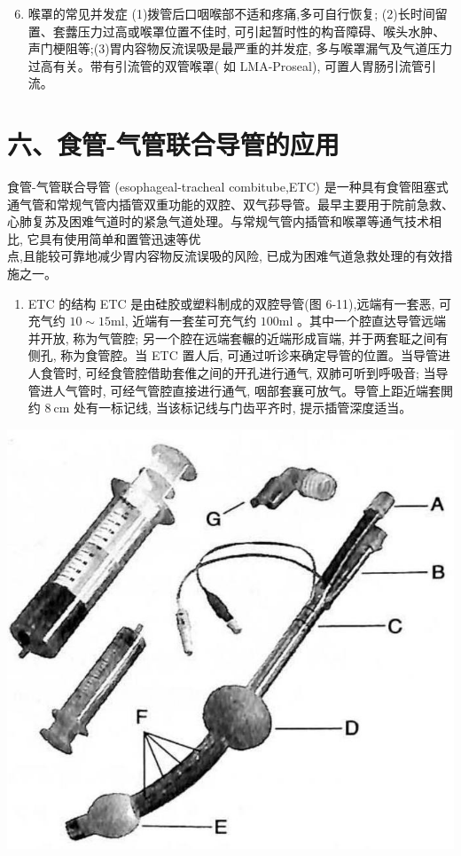 \documentclass[10pt]{article}
\begin{document}
\begin{enumerate}
  \setcounter{enumi}{5}
  \item 喉罩的常见并发症 (1)拨管后口咽喉部不适和疼痛,多可自行恢复; (2)长时间留置、套虂压力过高或喉罩位置不佳时, 可引起暂时性的构音障碍、喉头水肿、声门梗阻等;(3)胃内容物反流误吸是最严重的并发症, 多与喉罩漏气及气道压力过高有关。带有引流管的双管喉罩( 如 LMA-Proseal), 可置人胃肠引流管引流。
\end{enumerate}

\section*{六、食管-气管联合导管的应用}
食管-气管联合导管 (esophageal-tracheal combitube,ETC) 是一种具有食管阻塞式通气管和常规气管内插管双重功能的双腔、双气莏导管。最早主要用于院前急救、心肺复苏及困难气道时的紧急气道处理。与常规气管内插管和喉罩等通气技术相比, 它具有使用简单和置管迅速等优\\
点,且能较可靠地减少胃内容物反流误吸的风险, 已成为困难气道急救处理的有效措施之一。

\begin{enumerate}
  \item ETC 的结构 ETC 是由硅胶或塑料制成的双腔导管(图 6-11),远端有一套恶, 可充气约 $10 \sim 15 \mathrm{ml}$, 近端有一套苼可充气约 $100 \mathrm{ml}$ 。其中一个腔直达导管远端并开放, 称为气管腔; 另一个腔在远端套輾的近端形成盲端, 并于两套聇之间有侧孔, 称为食管腔。当 ETC 置人后, 可通过听诊来确定导管的位置。当导管进人食管时, 可经食管腔借助套倠之间的开孔进行通气, 双肺可听到呼吸音; 当导管进人气管时, 可经气管腔直接进行通气, 咽部套襄可放气。导管上距近端套閧约 $8 \mathrm{~cm}$ 处有一标记线, 当该标记线与门齿平齐时, 提示插管深度适当。
\end{enumerate}

\begin{center}
\includegraphics[max width=\textwidth]{2024_07_09_002a177993bd97d1d6d7g-095}
\end{center}
\end{document}
